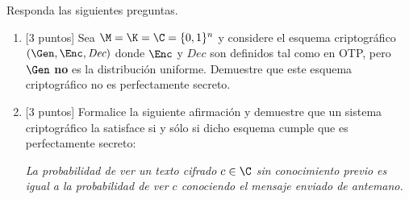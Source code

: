 
Responda las siguientes preguntas.
\begin{enumerate}
\item {[3 puntos]} Sea $\M=\K=\C=\{0, 1\}^n$ y considere el esquema criptográfico $(\Gen, \Enc, \textit{Dec})$ donde $\Enc$ y $\textit{Dec}$ son definidos tal como en OTP, pero $\Gen$ \textbf{no} es la distribución uniforme. Demuestre que este esquema criptográfico no es perfectamente secreto.

\item {[3 puntos]} Formalice la siguiente afirmación y demuestre que un sistema criptográfico la satisface si y sólo si dicho esquema cumple que es perfectamente secreto:
\begin{center}
  \it{La probabilidad de ver un texto cifrado $c\in \C$ sin conocimiento previo es igual a la probabilidad de ver $c$ conociendo el mensaje enviado de antemano.}
  \end{center}
\end{enumerate}


